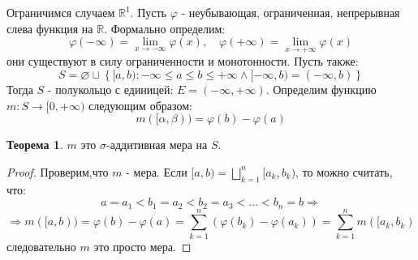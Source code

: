 \documentclass[12pt]{article}
\newcommand{\MR}{\mathbb{R}}
\newcommand{\VN}{\varnothing}
\theoremstyle{definition}
\newtheorem{theorem}{Теорема}
\begin{document}
Ограничимся случаем $\MR^1$. Пусть $\varphi$ - неубывающая, ограниченная, непрерывная слева функция на $\MR$. Формально определим:
$$
	\varphi(-\infty) = \lim\limits_{x \to - \infty}\varphi(x), \quad 	\varphi(+\infty) = \lim\limits_{x \to + \infty}\varphi(x)
$$
они существуют в силу ограниченности и монотонности. Пусть также:
$$
	S = \VN \sqcup \left\{[a,b) \colon -\infty \leq a \leq b \leq + \infty \wedge [-\infty,b) = (-\infty,b) \right\}
$$
Тогда $S$ - полукольцо с единицей: $E = (-\infty, +\infty)$. Определим функцию $m \colon S \to [0, +\infty)$ следующим образом:
$$
	m([\alpha,\beta)) = \varphi(b) - \varphi(a)
$$
\begin{theorem}
	$m$ это $\sigma$-аддитивная мера на $S$.
\end{theorem}
\begin{proof}
	Проверим,что $m$ - мера. Если $[a,b) = \bigsqcup\limits_{k = 1}^n[a_k, b_k)$, то можно считать, что:
	$$
		a = a_1 < b_1 = a_2 < b_2 = a_3 < \dotsc < b_n = b \Rightarrow
	$$
	$$
		\Rightarrow m([a,b)) = \varphi(b) - \varphi(a) = \sum\limits_{k = 1}^n \left(\varphi(b_k) - \varphi(a_k)\right) = \sum\limits_{k = 1}^nm([a_k,b_k)
	$$
	следовательно $m$ это просто мера. 
	

\end{proof}
\end{document}
